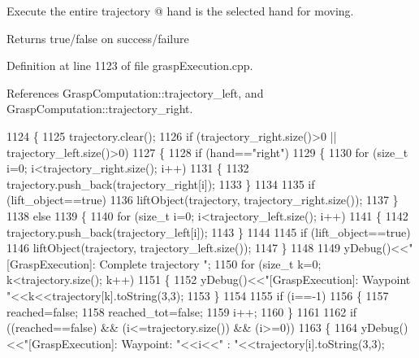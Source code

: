 Execute the entire trajectory @ hand is the selected hand for moving. 

\begin{DoxyReturn}{Returns}
true/false on success/failure 
\end{DoxyReturn}


Definition at line 1123 of file grasp\+Execution.\+cpp.



References Grasp\+Computation\+::trajectory\+\_\+left, and Grasp\+Computation\+::trajectory\+\_\+right.


\begin{DoxyCode}
1124 \{
1125     trajectory.clear();
1126     \textcolor{keywordflow}{if} (trajectory_right.size()>0 || trajectory_left.size()>0)
1127     \{
1128         \textcolor{keywordflow}{if} (hand==\textcolor{stringliteral}{"right"})
1129         \{
1130             \textcolor{keywordflow}{for} (\textcolor{keywordtype}{size\_t} i=0; i<trajectory_right.size(); i++)
1131             \{               
1132                 trajectory.push\_back(trajectory_right[i]);
1133             \}
1134 
1135             \textcolor{keywordflow}{if} (lift_object==\textcolor{keyword}{true})
1136                 liftObject(trajectory, trajectory_right.size());
1137         \}
1138         \textcolor{keywordflow}{else}
1139         \{
1140             \textcolor{keywordflow}{for} (\textcolor{keywordtype}{size\_t} i=0; i<trajectory_left.size(); i++)
1141             \{
1142                 trajectory.push\_back(trajectory_left[i]);
1143             \}
1144 
1145             \textcolor{keywordflow}{if} (lift_object==\textcolor{keyword}{true})
1146                 liftObject(trajectory, trajectory_left.size());
1147         \}
1148 
1149         yDebug()<<\textcolor{stringliteral}{"[GraspExecution]: Complete trajectory "};
1150         \textcolor{keywordflow}{for} (\textcolor{keywordtype}{size\_t} k=0; k<trajectory.size(); k++)
1151         \{
1152             yDebug()<<\textcolor{stringliteral}{"[GraspExecution]: Waypoint "}<<k<<trajectory[k].toString(3,3);
1153         \}
1154 
1155         \textcolor{keywordflow}{if} (i==-1)
1156         \{
1157             reached=\textcolor{keyword}{false};
1158             reached_tot=\textcolor{keyword}{false};
1159             i++;
1160         \}
1161 
1162         \textcolor{keywordflow}{if} ((reached==\textcolor{keyword}{false}) && (i<=trajectory.size()) && (i>=0))
1163         \{
1164             yDebug()<<\textcolor{stringliteral}{"[GraspExecution]: Waypoint: "}<<i<<\textcolor{stringliteral}{" : "}<<trajectory[i].toString(3,3);

\end{DoxyCode}
